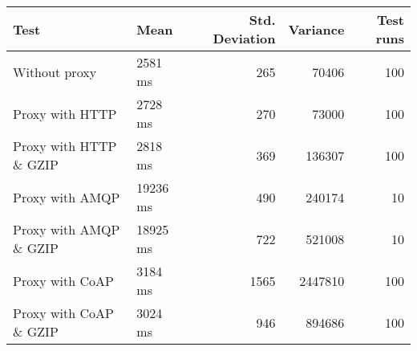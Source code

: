 \begin{tabularx}{\textwidth}{llrrr}
\hline
 Test                   & Mean     &   Std. Deviation &   Variance &   Test runs \\
\hline
 Without proxy          & 2581 ms  &              265 &      70406 &         100 \\
 Proxy with HTTP        & 2728 ms  &              270 &      73000 &         100 \\
 Proxy with HTTP \& GZIP & 2818 ms  &              369 &     136307 &         100 \\
 Proxy with AMQP        & 19236 ms &              490 &     240174 &          10 \\
 Proxy with AMQP \& GZIP & 18925 ms &              722 &     521008 &          10 \\
 Proxy with CoAP        & 3184 ms  &             1565 &    2447810 &         100 \\
 Proxy with CoAP \& GZIP & 3024 ms  &              946 &     894686 &         100 \\
\hline
\end{tabularx}